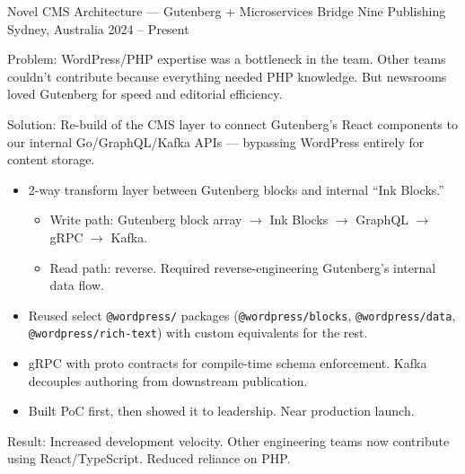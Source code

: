 

\begin{cventries}

  \cventry
    {Novel CMS Architecture --- Gutenberg + Microservices Bridge} %
    {Nine Publishing} %
    {Sydney, Australia} %
    {2024 -- Present} %
    {
      \begin{cvitems}
        \item {Problem: WordPress/PHP expertise was a bottleneck in the team. Other teams couldn't contribute because everything needed PHP knowledge. But newsrooms loved Gutenberg for speed and editorial efficiency.}
        \item {Solution: Re-build of the CMS layer to connect Gutenberg's React components to our internal Go/GraphQL/Kafka APIs --- bypassing WordPress entirely for content storage.}
            \begin{itemize}
                \item {2-way transform layer between Gutenberg blocks and internal ``Ink Blocks.''}
                    \begin{itemize}
                        \item {Write path: Gutenberg block array $\rightarrow$ Ink Blocks $\rightarrow$ GraphQL $\rightarrow$ gRPC $\rightarrow$ Kafka.}
                        \item {Read path: reverse. Required reverse-engineering Gutenberg's internal data flow.}
                    \end{itemize}
                \item {Reused select \texttt{@wordpress/} packages (\texttt{@wordpress/blocks}, \texttt{@wordpress/data}, \texttt{@wordpress/rich-text}) with custom equivalents for the rest.}
                \item {gRPC with proto contracts for compile-time schema enforcement. Kafka decouples authoring from downstream publication.}
                \item {Built PoC first, then showed it to leadership. Near production launch.}
            \end{itemize}
        \item {Result: Increased development velocity. Other engineering teams now contribute using React/TypeScript. Reduced reliance on PHP.}
      \end{cvitems}
    }


\end{cventries}
